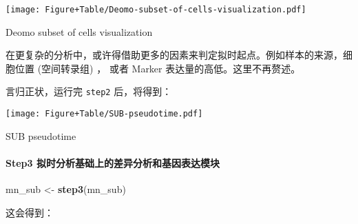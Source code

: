 \documentclass[
]{article}
\newenvironment{Shaded}{\begin{snugshade}}{\end{snugshade}}
\newcommand{\KeywordTok}[1]{\textcolor[rgb]{0.13,0.29,0.53}{\textbf{#1}}}
\newcommand{\NormalTok}[1]{#1}
\newcommand{\OperatorTok}[1]{\textcolor[rgb]{0.81,0.36,0.00}{\textbf{#1}}}
\newcommand{\StringTok}[1]{\textcolor[rgb]{0.31,0.60,0.02}{#1}}
\begin{document}
\def\@captype{figure}
\begin{center}
\texttt{[image: Figure+Table/Deomo-subset-of-cells-visualization.pdf]}
\caption{Deomo subset of cells visualization}\label{fig:Deomo-subset-of-cells-visualization}
\end{center}

在更复杂的分析中，或许得借助更多的因素来判定拟时起点。例如样本的来源，细胞位置 (空间转录组) ，
或者 Marker 表达量的高低。这里不再赘述。

言归正状，运行完 \texttt{step2} 后，将得到：

\begin{Shaded}
\end{Shaded}

\def\@captype{figure}
\begin{center}
\texttt{[image: Figure+Table/SUB-pseudotime.pdf]}
\caption{SUB pseudotime}\label{fig:SUB-pseudotime}
\end{center}

\hypertarget{step3-ux62dfux65f6ux5206ux6790ux57faux7840ux4e0aux7684ux5deeux5f02ux5206ux6790ux548cux57faux56e0ux8868ux8fbeux6a21ux5757}{%
\paragraph{Step3 拟时分析基础上的差异分析和基因表达模块}\label{step3-ux62dfux65f6ux5206ux6790ux57faux7840ux4e0aux7684ux5deeux5f02ux5206ux6790ux548cux57faux56e0ux8868ux8fbeux6a21ux5757}}

\begin{Shaded}
\begin{Highlighting}[]
\NormalTok{mn\_sub \textless{}{-}}\StringTok{ }\KeywordTok{step3}\NormalTok{(mn\_sub)}
\end{Highlighting}
\end{Shaded}

这会得到：

\begin{Shaded}
\end{Shaded}
\end{document}
